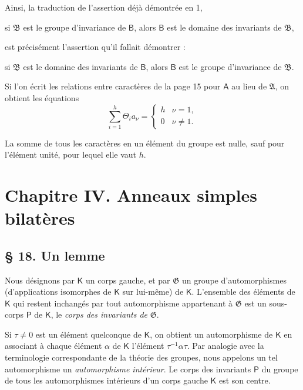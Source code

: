 Ainsi, la traduction de l'assertion déjà démontrée en 1,

si \(\mathfrak B\) est le groupe d'invariance de \(\mathsf B\), alors \(\mathsf B\) est le domaine des invariants de \(\mathfrak B\),

est précisément l'assertion qu'il fallait démontrer :

si \(\mathfrak B\) est le domaine des invariants de \(\mathsf B\), alors \(\mathsf B\) est le groupe d'invariance de \(\mathfrak B\).

Si l'on écrit les relations entre caractères de la page 15 pour \(\mathsf A\) au lieu de \(\mathfrak A\), on obtient les équations
\[
\sum_{i=1}^{h} \Theta_i a_\nu =
\begin{cases}
h & \nu=1,\\
0 & \nu\ne 1.
\end{cases}
\]

La somme de tous les caractères en un élément du groupe est nulle, sauf pour l'élément unité, pour lequel elle vaut \(h\).

\section*{Chapitre IV. Anneaux simples bilatères}\label{fr-r823-chapitre-iv-anneaux-simples-bilateres}

\subsection*{\S{} 18. Un lemme}\label{fr-r823-un-lemme}

Nous désignons par \(\mathsf K\) un corps gauche, et par \(\mathfrak G\) un groupe d'automorphismes (d'applications isomorphes de \(\mathsf K\) sur lui-même) de \(\mathsf K\). L'ensemble des éléments de \(\mathsf K\) qui restent inchangés par tout automorphisme appartenant à \(\mathfrak G\) est un sous-corps \(\mathsf P\) de \(\mathsf K\), le \emph{corps des invariants de} \(\mathfrak G\).

Si \(\tau\ne 0\) est un élément quelconque de \(\mathsf K\), on obtient un automorphisme de \(\mathsf K\) en associant à chaque élément \(\alpha\) de \(\mathsf K\) l'élément \(\tau^{-1}\alpha\tau\). Par analogie avec la terminologie correspondante de la théorie des groupes, nous appelons un tel automorphisme un \emph{automorphisme intérieur}. Le corps des invariants \(\mathsf P\) du groupe de tous les automorphismes intérieurs d'un corps gauche \(\mathsf K\) est son centre.

